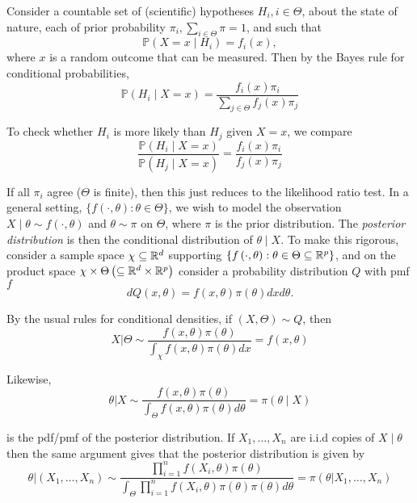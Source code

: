 \documentclass[a4paper]{article}
\begin{document}
\begin{eg}
	Consider a countable set of (scientific) hypotheses $H_i, i \in \Theta$, about the state of nature, each of prior probability $\pi_i, \sum_{i \in \Theta} \pi = 1$, and such that
	\[
		\mathbb{P}\left( X=x \mid H_i \right) = f_i(x)
	,\]
	where $x$ is a random outcome that can be measured. Then by the Bayes rule for conditional probabilities,
	\[
		\mathbb{P}\left( H_i  \mid  X = x \right) = \frac{f_i(x) \pi_i}{\sum_{j\in \Theta} f_j(x) \pi_j}
	\]

	To check whether $H_i$ is more likely than $H_j$ given  $X=x$, we compare
	 \[
		 \frac{\mathbb{P}\left( H_i  \mid X=x \right)}{\mathbb{P}\left( H_j  \mid X=x \right)} = \frac{f_i(x)\pi_i}{f_j(x)\pi_j}
	\]

	If all $\pi_i$ agree ($\Theta$ is finite), then this just reduces to the likelihood ratio test. In a general setting, $\{f\left( \cdot , \theta \right) : \theta \in \Theta \}$, we wish to model the observation $X \mid \theta \sim f(\cdot , \theta)$ and $\theta \sim \pi$ on $\Theta$, where $\pi$ is the prior distribution. The \textit{posterior distribution} is then the conditional distribution of $\theta  \mid X$. To make this rigorous, consider a sample space $\chi \subseteq \mathbb{R}^{d}$ supporting $\{f\left( \cdot , \theta \right) : \theta \in \Theta \subseteq \mathbb{R}^{p}\}$, and on the product space $\chi \times \Theta \left( \subseteq \mathbb{R}^{d} \times \mathbb{R}^{p} \right) $ consider a probability distribution $Q$ with pmf $f$
	 \[
		 dQ(x,\theta) = f(x,\theta)\pi(\theta)dxd\theta
	 .\]

	 By the usual rules for conditional densities, if $(X,\Theta) \sim Q$, then
	 \[
		 X | \Theta \sim \frac{f(x,\theta)\pi(\theta)}{\int_{\chi}f(x,\theta)\pi(\theta)dx} = f(x,\theta)
	 \]

	 Likewise,
	 \[
		 \theta  | X \sim \frac{f(x,\theta)\pi(\theta)}{\int_{\Theta} f(x,\theta) \pi(\theta) d\theta} = \pi(\theta \mid X)
	 \]

	 is the pdf/pmf of the posterior distribution. If $X_1, \ldots, X_n$ are i.i.d copies of $X \mid \theta$ then the same argument gives that the posterior distribution is given by  
	 \[
		 \theta|(X_1, \ldots, X_n) \sim \frac{\prod_{i=1}^{n}f(X_i, \theta) \pi(\theta)}{\int_{\Theta} \prod_{i=1}^{n} f(X_i, \theta) \pi(\theta) \pi(\theta) d\theta} = \pi(\theta|X_1, \ldots, X_n)
	 \] 
	 
\end{eg}
\end{document}
